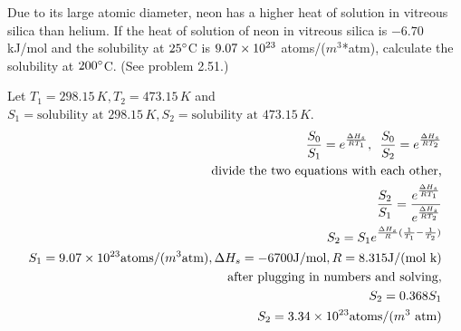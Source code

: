 \documentclass[12pt]{article}
\newenvironment{problem}[2][Problem]{\begin{trivlist}
\item[\hskip \labelsep {\bfseries #1}\hskip \labelsep {\bfseries #2.}]}{\end{trivlist}}
\begin{document}
\begin{problem}{2.52}
Due to its large atomic diameter, neon has a higher heat of solution in vitreous silica than helium. If the heat of solution of neon in vitreous silica is $-6.70$ kJ/mol and the solubility at $25\degree$C is $9.07 \times 10^{23}$ atoms/($m^3$*atm), calculate the solubility at $200\degree$C. (See problem 2.51.)
\end{problem}

Let $T_1 = 298.15\,K, T_2 = 473.15\,K$ and $S_1 = \text{solubility at } 298.15\,K, S_2 = \text{solubility at } 473.15\,K$.
\begin{align*}
\frac{S_0}{S_1} = e^{\frac{\Delta H_s}{RT_1}}, \,\,\, \frac{S_0}{S_2} = e^{\frac{\Delta H_s}{RT_2}} \\
\text{divide the two equations with each other,} \\
\frac{S_2}{S_1} = \frac{ e^{\frac{\Delta H_s}{RT_1}}}{e^{\frac{\Delta H_s}{RT_2}}} \\
S_2 = S_1 e^{\frac{\Delta H_s}{R}(\frac{1}{T_1} - \frac{1}{T_2})} \\
S_1 = 9.07 \times 10^{23} \text{atoms/($m^3$atm)}, \Delta H_s = -6700 \text{J/mol}, R = 8.315 \text{J/(mol k)} \\
\text{after plugging in numbers and solving,} \\
S_2 = 0.368S_1 \\
S_2 = 3.34 \times 10^{23} \text{atoms/($m^3$ atm)}
\end{align*}
 
\end{document}
